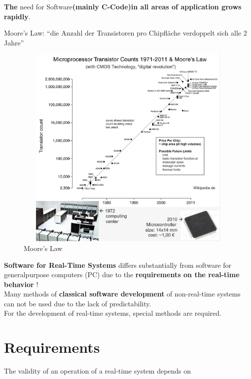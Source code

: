 \textbf{The} need for Software\textbf{(mainly C-Code)in all areas of application grows rapidly}. 

\begin{tcolorbox}[colback=blue!5!white,colframe=blue!75!black]
  Moore's Law: “die Anzahl der Transistoren pro Chipfläche verdoppelt sich alle 2 Jahre”
\end{tcolorbox}

\begin{figure}[h]
    \centering
    \includegraphics[width=13cm, height=10cm]{Images/image9.png}
    \caption{Moore's Law}
    \label{fig:Fig 3}
\end{figure}

\textbf{ Software for Real-Time Systems} differs substantially from software for generalpurpose computers (PC) due to the \textbf{requirements on the real-time behavior} !\\

Many methods of \textbf{classical software development} of non-real-time systems can not be used due to the lack of predictability.\\

For the development of real-time systems, special methods are required.\\


\section{ Requirements}

\newpage The validity of an operation of a real-time system depends on

